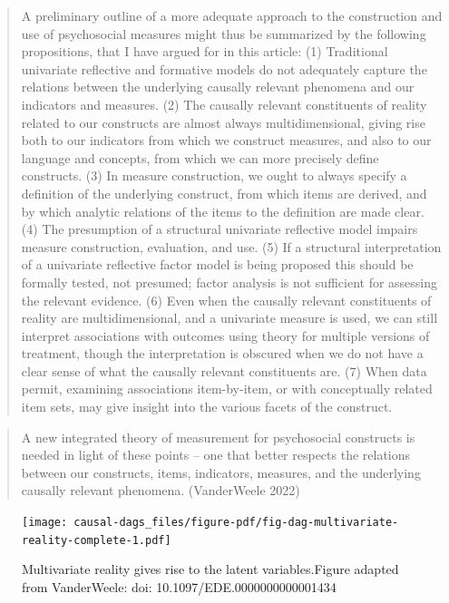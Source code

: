 \documentclass[
  singlecolumn]{report}
\begin{document}
\begin{quote}
A preliminary outline of a more adequate approach to the construction
and use of psychosocial measures might thus be summarized by the
following propositions, that I have argued for in this article: (1)
Traditional univariate reflective and formative models do not adequately
capture the relations between the underlying causally relevant phenomena
and our indicators and measures. (2) The causally relevant constituents
of reality related to our constructs are almost always multidimensional,
giving rise both to our indicators from which we construct measures, and
also to our language and concepts, from which we can more precisely
define constructs. (3) In measure construction, we ought to always
specify a definition of the underlying construct, from which items are
derived, and by which analytic relations of the items to the definition
are made clear. (4) The presumption of a structural univariate
reflective model impairs measure construction, evaluation, and use. (5)
If a structural interpretation of a univariate reflective factor model
is being proposed this should be formally tested, not presumed; factor
analysis is not sufficient for assessing the relevant evidence. (6) Even
when the causally relevant constituents of reality are multidimensional,
and a univariate measure is used, we can still interpret associations
with outcomes using theory for multiple versions of treatment, though
the interpretation is obscured when we do not have a clear sense of what
the causally relevant constituents are. (7) When data permit, examining
associations item-by-item, or with conceptually related item sets, may
give insight into the various facets of the construct.
\end{quote}

\begin{quote}
A new integrated theory of measurement for psychosocial constructs is
needed in light of these points -- one that better respects the
relations between our constructs, items, indicators, measures, and the
underlying causally relevant phenomena. (VanderWeele 2022)
\end{quote}

\begin{figure}

{\centering \texttt{[image: causal-dags\_files/figure-pdf/fig-dag-multivariate-reality-complete-1.pdf]}

}

\caption{\label{fig-dag-multivariate-reality-complete}Multivariate
reality gives rise to the latent variables.Figure adapted from
VanderWeele: doi: 10.1097/EDE.0000000000001434}

\end{figure}
\end{document}
